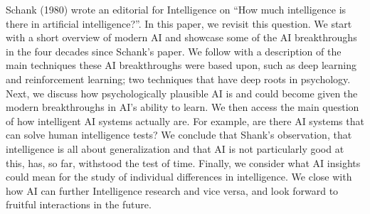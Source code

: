 
Schank (1980) wrote an editorial for Intelligence on
``How much intelligence is there in artificial intelligence?''.
In this paper, we revisit this question.
We start with a short overview of modern AI and showcase some of
the AI breakthroughs in the four decades since Schank's paper.
We follow with a description of the main techniques these AI
breakthroughs were based upon, such as deep learning and reinforcement
learning; two techniques that have deep roots in psychology.
Next, we discuss how psychologically plausible AI is and could become
given the modern breakthroughs in AI's ability to learn.
We then access the main question of how intelligent AI systems
actually are.
For example, are there AI systems that can solve human intelligence
tests?
We conclude that Shank's observation, that intelligence is all about
generalization and that AI is not particularly good at this, has,
so far, withstood the test of time.
Finally, we consider what AI insights could mean for the study of
individual differences in intelligence.
We close with how AI can further Intelligence research and vice versa,
and look forward to fruitful interactions in the future.
